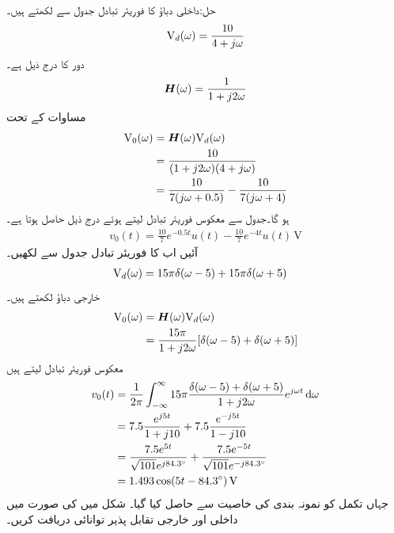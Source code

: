 حل:داخلی دباؤ  کا فوریئر تبادل جدول  سے لکھتے ہیں۔
\begin{align*}
{\ensuremath{{\textup{V}}}}_d(\omega)=\frac{10}{4+j\omega}
\end{align*}
دور کا  درج ذیل ہے۔
\begin{align*}
{\ensuremath{{\boldsymbol{H}}}}(\omega)=\frac{1}{1+j2\omega}
\end{align*}
مساوات  کے تحت
\begin{align*}
{\ensuremath{{\textup{V}}}}_0(\omega)&={{\boldsymbol{H}}}(\omega) {{\textup{V}}}_d(\omega)\\
&=\frac{10}{(1+j2\omega)(4+j\omega)}\\
&=\frac{10}{7(j\omega+0.5)}-\frac{10}{7(j\omega+4)}
\end{align*}
ہو گا۔جدول  سے معکوس فوریئر تبادل لیتے ہوئے درج ذیل حاصل ہوتا ہے۔
\begin{align*}
v_0(t)=\frac{10}{7} e^{-0.5t}u(t)-\frac{10}{7}e^{-4t}u(t) \,\si{\volt}
\end{align*}
آئیں اب  کا فوریئر تبادل جدول سے لکھیں۔
\begin{align*}
{\ensuremath{{\textup{V}}}}_d(\omega)&=15\pi\delta(\omega-5)+15\pi\delta(\omega+5)
\end{align*}
خارجی دباؤ لکھتے ہیں۔
\begin{align*}
{\ensuremath{{\textup{V}}}}_0(\omega)&={{\boldsymbol{H}}}(\omega){{\textup{V}}}_d(\omega)\\
&=\frac{15\pi}{1+j2\omega}[\delta(\omega-5)+\delta(\omega+5)]
\end{align*}
معکوس فوریئر  تبادل لیتے ہیں
\begin{align*}
v_0(t)&=\frac{1}{2\pi}\int_{-\infty}^{\infty} 15\pi \frac{\delta(\omega-5)+\delta(\omega+5)}{1+j2\omega} e^{j\omega t} \dif \omega\\
&=7.5 \frac{e^{j5t}}{1+j10}+7.5\frac{e^{-j5t}}{1-j10}\\
&=\frac{7.5e^{5t}}{\sqrt{101}e^{j84.3^{\circ}}}+\frac{7.5e^{-5t}}{\sqrt{101}e^{-j84.3^{\circ}}}\\
&=1.493\cos(5t-84.3^{\circ})\,\si{\volt}
\end{align*}
جہاں تکمل کو نمونہ بندی کی خاصیت سے حاصل کیا گیا۔
شکل  میں   کی صورت میں داخلی اور خارجی تقابل پذیر توانائی دریافت کریں۔

